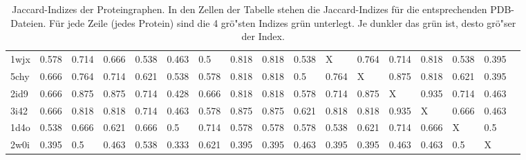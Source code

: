 \documentclass{report}
\begin{document}
\begin{table}
{\begin{tabular}{l l l l l l l l l l l l l l l l l}
1wjx & 0.578 & 0.714 & 0.666 & 0.538 & 0.463 & 0.5 & \cellcolor{fGreen!50}0.818 & \cellcolor{fGreen!100}0.818 & 0.538 &   X   & \cellcolor{fGreen!25}0.764 & 0.714 & \cellcolor{fGreen!75}0.818 & 0.538 & 0.395 &  \\
5chy & 0.666 & 0.764 & 0.714 & 0.621 & 0.538 & 0.578 & \cellcolor{fGreen!75}0.818 & \cellcolor{fGreen!25}0.818 & 0.5 & 0.764 &   X   & \cellcolor{fGreen!100}0.875 & \cellcolor{fGreen!50}0.818 & 0.621 & 0.395 &  \\
2id9 & 0.666 & \cellcolor{fGreen!50}0.875 & \cellcolor{fGreen!25}0.875 & 0.714 & 0.428 & 0.666 & 0.818 & 0.818 & 0.578 & 0.714 & \cellcolor{fGreen!75}0.875 &   X   & \cellcolor{fGreen!100}0.935 & 0.714 & 0.463 &  \\
3i42 & 0.666 & 0.818 & 0.818 & 0.714 & 0.463 & 0.578 & \cellcolor{fGreen!50}0.875 & \cellcolor{fGreen!75}0.875 & 0.621 & \cellcolor{fGreen!25}0.818 & 0.818 & \cellcolor{fGreen!100}0.935 &   X   & 0.666 & 0.463 &  \\
1d4o & 0.538 & \cellcolor{fGreen!50}0.666 & 0.621 & 0.666 & 0.5 & \cellcolor{fGreen!100}0.714 & 0.578 & 0.578 & 0.578 & 0.538 & 0.621 & \cellcolor{fGreen!75}0.714 & \cellcolor{fGreen!25}0.666 &   X   & 0.5 &  \\
2w0i & 0.395 & \cellcolor{fGreen!50}0.5 & 0.463 & \cellcolor{fGreen!75}0.538 & 0.333 & \cellcolor{fGreen!100}0.621 & 0.395 & 0.395 & 0.463 & 0.395 & 0.395 & 0.463 & 0.463 & \cellcolor{fGreen!25}0.5 &   X   &  \\

\end{tabular}}
\caption{Jaccard-Indizes der Proteingraphen. In den Zellen der Tabelle stehen die Jaccard-Indizes f\"ur die entsprechenden PDB-Dateien. F\"ur jede Zeile (jedes Protein) sind die 4 gr\"o"sten Indizes gr\"un unterlegt. Je dunkler das gr\"un ist, desto gr\"o"ser der Index.}
\label{table:occ-pg-tf}
\end{table}
\end{document}
